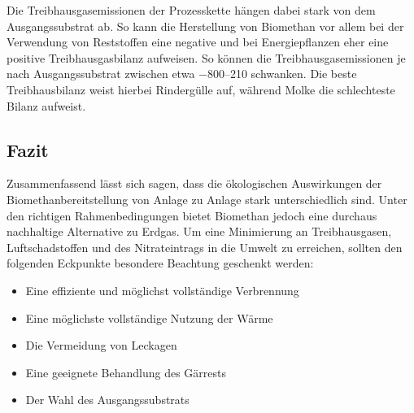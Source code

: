 Die Treibhausgasemissionen der Prozesskette hängen dabei stark von dem Ausgangssubstrat ab. So kann die Herstellung von Biomethan vor allem bei der Verwendung von Reststoffen eine negative und bei Energiepflanzen eher eine positive Treibhausgasbilanz aufweisen. So können die Treibhausgasemissionen je nach Ausgangssubstrat zwischen etwa \SIrange{-800}{210}{\gcoeqmj} schwanken. Die beste Treibhausbilanz weist hierbei Rindergülle auf, während Molke die schlechteste Bilanz aufweist. \parencite{Tonini2016}


\subsection{Fazit}

Zusammenfassend lässt sich sagen, dass die ökologischen Auswirkungen der Biomethanbereitstellung von Anlage zu Anlage stark unterschiedlich sind. Unter den richtigen Rahmenbedingungen bietet Biomethan jedoch eine durchaus nachhaltige Alternative zu Erdgas. Um eine Minimierung an Treibhausgasen, Luftschadstoffen und des Nitrateintrags in die Umwelt zu erreichen, sollten den folgenden Eckpunkte besondere Beachtung geschenkt werden:

\begin{itemize}
	\item Eine effiziente und möglichst vollständige Verbrennung
	\item Eine möglichste vollständige Nutzung der Wärme
	\item Die Vermeidung von Leckagen
	\item Eine geeignete Behandlung des Gärrests
	\item Der Wahl des Ausgangssubstrats
\end{itemize}